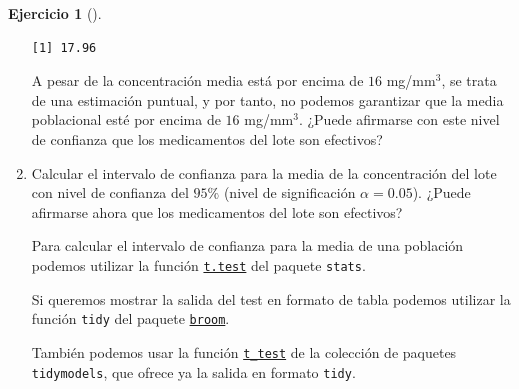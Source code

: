 \documentclass[
  a4paper,
]{scrreport}
\newenvironment{Shaded}{\begin{snugshade}}{\end{snugshade}}
\newcommand{\FunctionTok}[1]{\textcolor[rgb]{0.28,0.35,0.67}{#1}}
\newcommand{\NormalTok}[1]{\textcolor[rgb]{0.00,0.23,0.31}{#1}}
\newcommand{\SpecialCharTok}[1]{\textcolor[rgb]{0.37,0.37,0.37}{#1}}
\theoremstyle{definition}
\newtheorem{exercise}{Ejercicio}[chapter]
\theoremstyle{remark}
\begin{document}
\begin{exercise}[]
\begin{enumerate}
\begin{tcolorbox}
\begin{Shaded}
\end{Shaded}

\begin{verbatim}
[1] 17.96
\end{verbatim}

  A pesar de la concentración media está por encima de \(16\)
  mg/mm\(^3\), se trata de una estimación puntual, y por tanto, no
  podemos garantizar que la media poblacional esté por encima de \(16\)
  mg/mm\(^3\). ¿Puede afirmarse con este nivel de confianza que los
  medicamentos del lote son efectivos?

  \end{tcolorbox}
\item
  Calcular el intervalo de confianza para la media de la concentración
  del lote con nivel de confianza del \(95\%\) (nivel de significación
  \(\alpha =0.05\)). ¿Puede afirmarse ahora que los medicamentos del
  lote son efectivos?

  \begin{tcolorbox}[enhanced jigsaw, coltitle=black, left=2mm, colback=white, leftrule=.75mm, toptitle=1mm, breakable, bottomrule=.15mm, titlerule=0mm, bottomtitle=1mm, title=\textcolor{quarto-callout-note-color}{\faInfo}\hspace{0.5em}{Ayuda}, arc=.35mm, toprule=.15mm, rightrule=.15mm, colframe=quarto-callout-note-color-frame, opacityback=0, colbacktitle=quarto-callout-note-color!10!white, opacitybacktitle=0.6]

  Para calcular el intervalo de confianza para la media de una población
  podemos utilizar la función
  \href{https://www.rdocumentation.org/packages/stats/versions/3.6.2/topics/t.test}{\texttt{t.test}}
  del paquete \texttt{stats}.

  Si queremos mostrar la salida del test en formato de tabla podemos
  utilizar la función \texttt{tidy} del paquete
  \href{https://broom.tidymodels.org/index.html}{\texttt{broom}}.

  También podemos usar la función
  \href{https://infer.tidymodels.org/reference/t_test.html?q=t_test\#null}{\texttt{t\_test}}
  de la colección de paquetes \texttt{tidymodels}, que ofrece ya la
  salida en formato \texttt{tidy}.

  \end{tcolorbox}


\end{enumerate}
\end{exercise}
\end{document}
